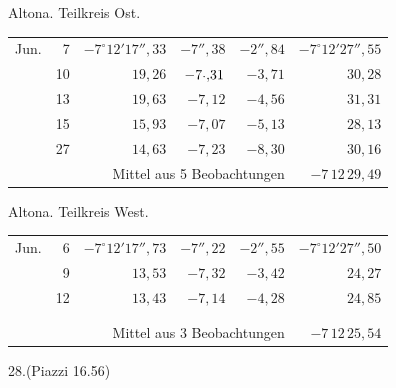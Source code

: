 \noindent\begin{minipage}[t]{.495\textwidth}\centering Altona. Teilkreis Ost.\par\smallskip
{\scriptsize\setlength{\tabcolsep}{1pt}\renewcommand{\arraystretch}{1.2}\begin{tabular}{lr|r|r|r|r|}
Jun.&7&$-7^\circ12'17''{,}33$&$-7''{,}38$&$-2''{,}84$&$-7^\circ12'27''{,}55$\\
&10&$19{,}26$&$-7\mathord{\text{\raisebox{.3ex}{.}}}{,}31$&$-3{,}71$&$30{,}28$\\
&13&$19{,}63$&$-7{,}12$&$-4{,}56$&$31{,}31$\\
&15&$15{,}93$&$-7{,}07$&$-5{,}13$&$28{,}13$\\
&27&$14{,}63$&$-7{,}23$&$-8{,}30$&$30{,}16$\\
\cline{6-6}\multicolumn{5}{r}{Mittel aus 5 Beobachtungen}&$-7\,12\,29{,}49$
\end{tabular}}\end{minipage}\hfill\begin{minipage}[t]{.495\textwidth}\centering Altona. Teilkreis West.\par\smallskip
{\scriptsize\setlength{\tabcolsep}{1pt}\renewcommand{\arraystretch}{1.2}\begin{tabular}{lr|r|r|r|r}
Jun.&6&$-7^\circ12'17''{,}73$&$-7''{,}22$&$-2''{,}55$&$-7^\circ12'27''{,}50$\\
&9&$13{,}53$&$-7{,}32$&$-3{,}42$&$24{,}27$\\
&12&$13{,}43$&$-7{,}14$&$-4{,}28$&$24{,}85$\\
&&&&&\\
&&&&&\\
\cline{6-6}\multicolumn{5}{r}{Mittel aus 3 Beobachtungen}&$-7\,12\,25{,}54$
\end{tabular}}\end{minipage}
\par\vspace{4mm}
\begin{center}28.\quad (Piazzi 16.56)\end{center}

